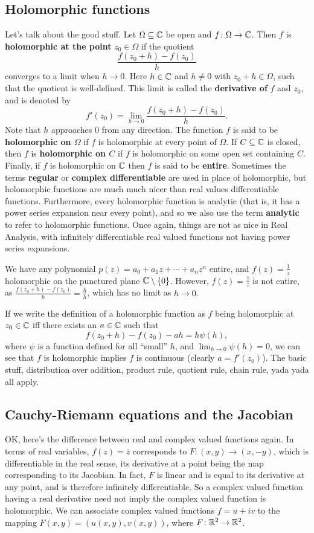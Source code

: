 \subsection{Holomorphic functions}
Let's talk about the good stuff. Let $\Omega \subseteq \mathbb{C}$ be open and $f \colon \Omega \to \mathbb{C}$. Then $f$ is \textbf{holomorphic at the point} $z_0 \in \Omega$ if the quotient \[
    \frac{f(z_0+h)-f(z_0)}{h}
\] converges to a limit when $h\to 0$. Here $h\in \mathbb{C}$ and $h\neq 0$ with $z_0+h\in \Omega$, such that the quotient is well-defined. This limit is called the \textbf{derivative of} $f$ and $z_0$, and is denoted by \[
f'(z_0) = \lim_{h\to 0}\frac{f(z_0+h)-f(z_0)}{h}.
\] Note that $h$ approaches $0$ from any direction. The function $f$ is said to be \textbf{holomorphic on $\Omega$} if $f$ is holomorphic at every point of $\Omega$. If $C\subseteq \mathbb{C}$ is closed, then $f$ is \textbf{holomorphic on $C$} if $f$ is holomorphic on some open set containing $C$. Finally, if $f$ is holomorphic on $\mathbb{C}$ then $f$ is said to be \textbf{entire}. Sometimes the terms \textbf{regular} or \textbf{complex differentiable} are used in place of holomorphic, but holomorphic functions are much much nicer than real values differentiable functions. Furthermore, every holomorphic function is analytic (that is, it has a power series expansion near every point), and so we also use the term \textbf{analytic} to refer to holomorphic functions. Once again, things are not as nice in Real Analysis, with infinitely differentiable real valued functions not having power series expansions.
\begin{example}
    We have any polynomial $p(z)=a_0+a_1z+\cdots+a_nz^n$ entire, and $f(z)=\frac{1}{z}$ holomorphic on the punctured plane $\mathbb{C}\setminus \{0\} $. However, $f(z)=\frac{\overline{z}}{z}$ is not entire, as $\frac{f(z_0+h)-f(z_0)}{h}=\frac{\overline{h}}{h}$, which has no limit as $h\to 0$.
\end{example}
If we write the definition of a holomorphic function as $f$ being holomorphic at $z_0\in \mathbb{C}$ iff there exists an $a\in \mathbb{C}$ such that\[
    f(z_0+h)-f(z_0)-ah=h\psi(h),
\] where $\psi$ is a function defined for all ``small'' $h$, and $\lim_{h\to 0}\psi(h)=0$, we can see that $f$ is holomorphic implies $f$ is continuous (clearly $a=f'(z_0)$). The basic stuff, distribution over addition, product rule, quotient rule, chain rule, yada yada all apply.
\subsection{Cauchy-Riemann equations and the Jacobian}
OK, here's the difference between real and complex valued functions again. In terms of real variables, $f(z)=\overline{z}$ corresponds to $F \colon (x,y) \to (x,-y)$, which is differentiable in the real sense, its derivative at a point being the map corresponding to its Jacobian. In fact, $F$ is linear and is equal to its derivative at any point, and is therefore infinitely differentiable. So a complex valued function having a real derivative need not imply the complex valued function is holomorphic. We can associate complex valued functions $f=u+iv$ to the mapping $F(x,y)=(u(x,y),v(x,y))$, where $F \colon \mathbb{R}^2 \to \mathbb{R}^2$.


